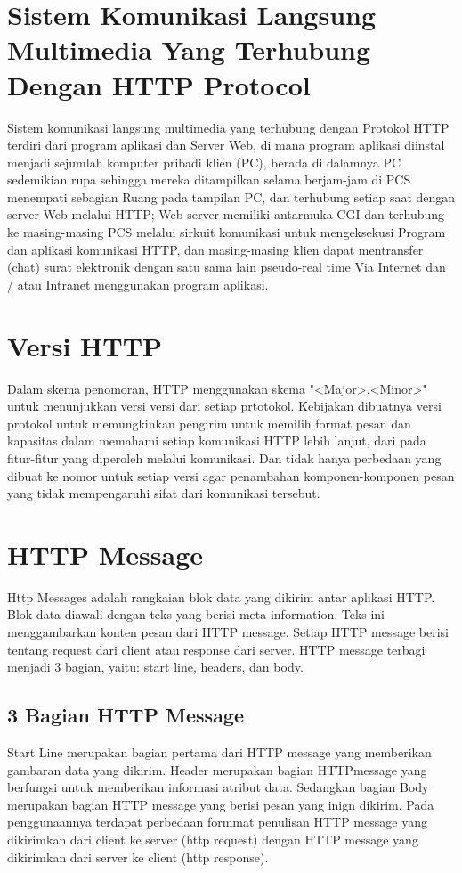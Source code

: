 \section{Sistem Komunikasi Langsung Multimedia Yang Terhubung Dengan HTTP Protocol}
Sistem komunikasi langsung multimedia yang terhubung dengan Protokol HTTP terdiri dari program aplikasi dan Server Web, di mana program aplikasi diinstal menjadi sejumlah komputer pribadi klien (PC), berada di dalamnya PC sedemikian rupa sehingga mereka ditampilkan selama berjam-jam di PCS menempati sebagian Ruang pada tampilan PC, dan terhubung setiap saat dengan server Web melalui HTTP; Web server memiliki antarmuka CGI dan terhubung ke masing-masing PCS melalui sirkuit komunikasi untuk mengeksekusi Program dan aplikasi komunikasi HTTP, dan masing-masing klien dapat mentransfer (chat) surat elektronik dengan satu sama lain pseudo-real time Via Internet dan / atau Intranet menggunakan program aplikasi\cite{nishizawa2005multimedia}.

\section{Versi HTTP}
Dalam skema penomoran, HTTP menggunakan skema "<Major>.<Minor>" untuk menunjukkan versi versi dari setiap prtotokol. Kebijakan dibuatnya versi protokol untuk memungkinkan pengirim untuk memilih format pesan dan kapasitas dalam memahami setiap komunikasi HTTP lebih lanjut, dari pada fitur-fitur yang diperoleh melalui komunikasi. Dan tidak hanya perbedaan yang dibuat ke nomor untuk setiap versi agar penambahan komponen-komponen pesan yang tidak mempengaruhi sifat dari komunikasi tersebut\cite{berners1996hypertext}.

\section{HTTP Message}
Http Messages adalah rangkaian blok data yang dikirim antar aplikasi HTTP. Blok data diawali dengan teks yang berisi meta information. Teks ini menggambarkan konten pesan dari HTTP message. Setiap HTTP message berisi tentang request dari client atau response dari server. HTTP message terbagi menjadi 3 bagian, yaitu: start line, headers, dan body\cite{hartono2013desain}.

\subsection{3 Bagian HTTP Message}
Start Line merupakan bagian pertama dari HTTP message yang memberikan gambaran data yang dikirim. Header merupakan bagian HTTPmessage yang berfungsi untuk memberikan informasi atribut data. Sedangkan bagian Body merupakan bagian HTTP message yang berisi pesan yang inign dikirim. Pada penggunaannya terdapat perbedaan formmat penulisan HTTP message yang dikirimkan dari client ke server (http request) dengan HTTP message yang dikirimkan dari server ke client (http response)\cite{hartono2013desain}.

